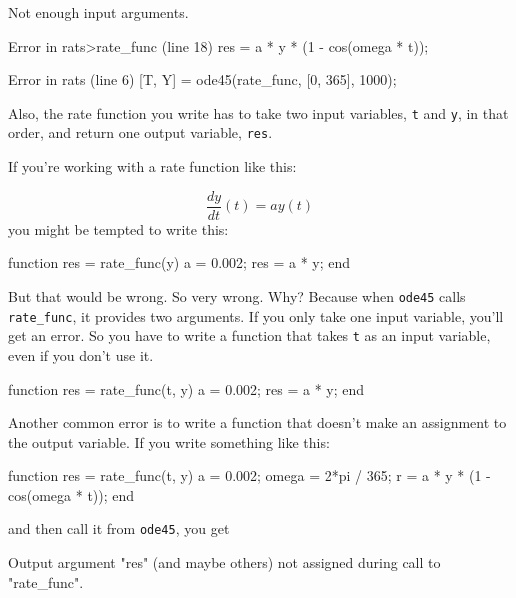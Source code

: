
\begin{code}
Not enough input arguments.

Error in rats>rate_func (line 18)
    res = a * y * (1 - cos(omega * t));

Error in rats (line 6)
    [T, Y] = ode45(rate_func, [0, 365], 1000);
\end{code}

Also, the rate function you write has to take two input variables, 
\lstinline{t} and \lstinline{y}, in that order, and return one output variable, 
\lstinline{res}.


If you're working with a rate function like this:

\begin{equation*}
\frac{dy}{dt}(t) = a y(t)
\end{equation*}
you might be tempted to write this:

\begin{code}
function res = rate_func(y)        %
    a = 0.002;
    res = a * y;
end
\end{code}

But that would be wrong.  So very wrong.  Why?  Because
when \lstinline{ode45} calls \lstinline{rate_func}, it provides two arguments.
If you only take one input variable, you'll get an error.  So
you have to write a function that takes \lstinline{t} as an input
variable, even if you don't use it.


\begin{code}
function res = rate_func(t, y)     %
    a = 0.002;
    res = a * y;
end
\end{code}

Another common error is to write a function that doesn't make
an assignment to the output variable.  If you write something
like this:

\begin{code}
function res = rate_func(t, y)
    a = 0.002;
    omega = 2*pi / 365;
    r = a * y * (1 - cos(omega * t));    %
end
\end{code}
and then call it from \lstinline{ode45}, you get

\begin{code}
Output argument "res" (and maybe others) not assigned during call
to "rate_func".
\end{code}

